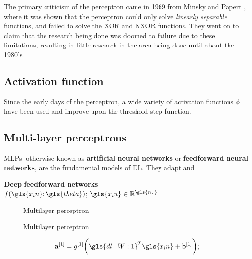The primary criticism of the perceptron came in 1969 from Minsky and Papert
\cite{minsky69perceptrons}, where it was shown that the perceptron could only
solve \textit{linearly separable} functions, and failed to solve the XOR and
NXOR functions. They went on to claim that the research being done was doomed to
failure due to these limitations, resulting in little research in the area being
done until about the 1980's.

\subsection{Activation function}

Since the early days of the perceptron, a wide variety of activation functions
$\phi$ have been used and improve upon the threshold step function.

%    


\subsection{Multi-layer perceptrons}
\Gls{MLPs}, otherwise known as \textbf{artificial neural networks} or
\textbf{feedforward neural networks}, are the fundamental models of \gls{DL}.
They adapt and

\textbf{Deep feedforward networks}
\\
$f(\gls{x_in}; \gls{theta})$; $\gls{x_in}\in\mathbb{R}^{\gls{n_x}}$

\begin{figure}
    \centering
    
    \caption{Multilayer perceptron}
    \label{fig:mlp}
\end{figure}


\begin{figure}
    \centering
    
    \caption{Multilayer perceptron}
    \label{fig:mlp-vec}
\end{figure}



\begin{equation}
    \mathbf{a}^{[1]} = g^{[1]} \bigg(\gls{dl:W:1}^T\gls{x_in} + \mathbf{b}^{[1]}\bigg);
\end{equation}

